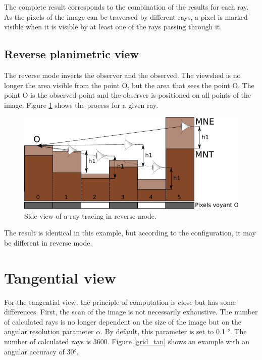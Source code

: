 \documentclass{report}
\begin{document}
The complete result corresponds to the combination of the results for each ray.
As the pixels of the image can be traversed by different rays, a pixel is marked visible when it is visible by at least one of the rays passing through it.

\subsection{Reverse planimetric view}

The reverse mode inverts the observer and the observed. The viewshed is no longer the area visible from the point O, but the area that sees the point O. The point O is the observed point and the observer is positioned on all points of the image. Figure \ref{ray_side_inverse} shows the process for a given ray.

\begin{figure}[H]
	\includegraphics{img/ray_side_inverse-fr.pdf} 
	\caption{Side view of a ray tracing in reverse mode.}
	\label{ray_side_inverse}
\end{figure}

The result is identical in this example, but according to the configuration, it may be different in reverse mode.

\section{Tangential view}
\label{principles_tan}
For the tangential view, the principle of computation is close but has some differences. First, the scan of the image is not necessarily exhaustive. The number of calculated rays is no longer dependent on the size of the image but on the angular resolution parameter $\alpha$. By default, this parameter is set to 0.1 °. The number of calculated rays is 3600. Figure \ref{grid_tan} shows an example with an angular accuracy of 30°.
\end{document}
